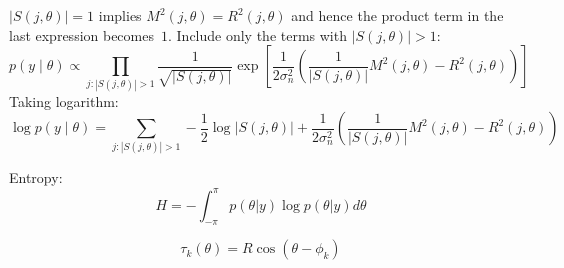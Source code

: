 \documentclass[a4paper]{article}
\begin{document}
$|S(j,\theta)|=1$ implies $M^2(j,\theta)=R^2(j,\theta)$ and hence the product term in the last expression becomes~$1$. Include only the terms with $|S(j,\theta)|>1$:
\begin{equation}
p(y \mid \theta) \propto  \prod_{j : |S(j,\theta)|>1} \frac{1} {\sqrt{|S(j,\theta)|}} \exp \left[{\frac{1}{2\sigma_n^2} \left(\frac{1}{|S(j,\theta)|}M^2(j,\theta)-R^2(j,\theta)\right)}\right]
\end{equation}
Taking logarithm:
\begin{equation}
\log p(y \mid \theta) =  \sum_{j : |S(j,\theta)|>1} -\frac{1} {2}\log|S(j,\theta)| +{\frac{1}{2\sigma_n^2} \left(\frac{1}{|S(j,\theta)|}M^2(j,\theta)-R^2(j,\theta)\right)}
\end{equation}

Entropy:
$$
H = -\int_{-\pi}^\pi p(\theta|y) \log p(\theta|y) d\theta
$$

$$
\tau_k(\theta) = R \cos(\theta - \phi_k)
$$
\end{document}
